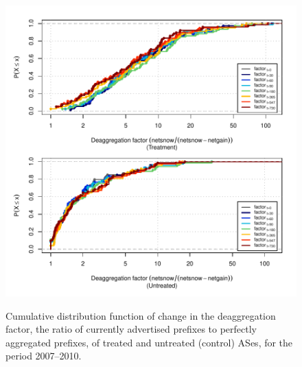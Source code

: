 \begin{figure}[H]
\begin{centering}
\begin{singlespace}
    \includegraphics[width=6in]{figures/behavior-deagg_factor-2007_2010-corr.pdf}
    \vspace{-2em}\\
    \caption{Cumulative distribution function of change in the deaggregation factor, the ratio of currently advertised prefixes to perfectly aggregated prefixes, of treated and untreated (control) ASes, for the period 2007--2010.}
\end{singlespace}
\end{centering}
\end{figure}